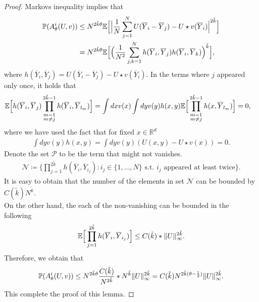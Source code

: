 \begin{proof}
	Markovs inequality   implies that 
	\begin{align*}
	\P(A_{\theta }^{i}(U,v) )&\le  N^{2 \tilde{k} \theta }  \E\Big[\Big|\frac{1}{N} \sum_{j=1}^N U(\overline{Y}_i - \overline{Y}_j) - U \star  v (\overline{Y}_i ) \Big|^{2 \tilde{k} } \Big]\\
	&=  N^{2 \tilde{k} \theta }  \E\Big[\Big(\frac{1}{N^2} \sum_{j,k=1}^{N}  h(\overline{Y}_i,\overline{Y}_j  )h(\overline{Y}_i,\overline{Y}_k  ) \Big)^{\tilde{k} } \Big]
	,\end{align*}
	where 
$h(\overline{Y}_i,\overline{Y}_j) =    U(\overline{Y}_i - \overline{Y}_j) - U \star  v (\overline{Y}_i)$.
	In the terms where $j$ appeared only once, it holds that
	\begin{align*}
	&\E\Big[h(\overline{Y}_i,\overline{Y}_j  ) \prod_{\substack{m=1\\ m\neq j}}^{2 \tilde{k}-1 } h(\overline{Y}_i , \overline{Y}_{l_m}  )\Big] 
	=  \int dx v(x) \int  dy v(y)h(x,y) \E\Big[\prod_{\substack{m=1\\ m\neq j}}^{2 \tilde{k}-1 } h(x, \overline{Y}_{l_m} )\Big] = 0 
	,\end{align*}
where we have used the fact that  for fixed $x \in  \mathbb{R}^{d} $
	\begin{align*}
	\int dy v(y)h(x,y) =  \int dy v(y) (U(x,y) - U \star  v(x)) = 0
	.\end{align*}
	Denote the set $\mathcal{P}$ to be the term that might not vanishes.
	\begin{align*}
	\mathcal{N} \coloneqq  \Big\{\prod_{j=1}^{2 \tilde{k} }h(\overline{Y}_i,\overline{Y}_{i_j}) : i_j \in  \{1 , \ldots , N\} \text{ s.t. } i_j \text{ appeared at least twice}   \Big\}  
	.\end{align*}
	It is easy to obtain that the number of the elements in set $\mathcal{N}$ can be bounded by $C(\tilde{k} )N^{\tilde{k} } $.\\[1ex]
	On the other hand, the each of the non-vanishing can be bounded in the following
	\begin{align*}
	\E\Big[\prod_{j=1}^{2 \tilde{k} }h(\overline{Y}_i,\overline{Y}_{i_j})\Big] \le  C(\tilde{k} )* \|U\|_{\infty}^{2 \tilde{k} } 
	.\end{align*}
Therefore, we obtain that 
	\begin{align*}
	\P(A_{\theta }^{i}(U,v) ) \le N^{2 \tilde{k}\theta  } \frac{C(\tilde{k} )}{N^{2 \tilde{k} } } * N^{\tilde{k} } \|U\|_{\infty}^{2 \tilde{k} }  = C(\tilde{k}) N^{2 \tilde{k}(\theta  - \frac{1}{2}) } \|U\|_{\infty}^{2 \tilde{k} }  
	.\end{align*}
This complete the proof of this lemma.
\end{proof}

